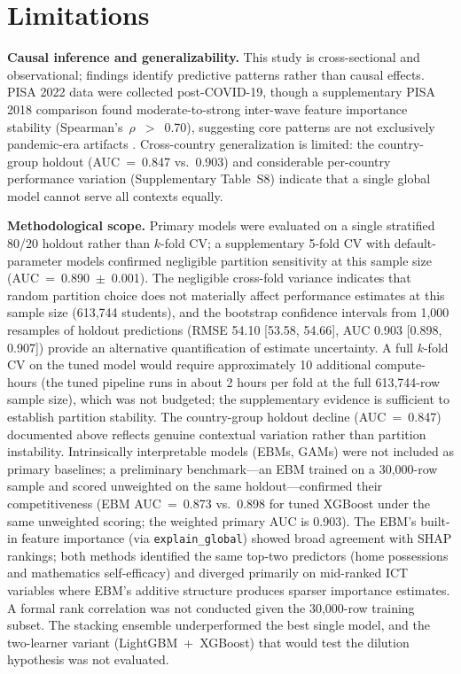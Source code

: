\documentclass[review,12pt]{elsarticle}
\begin{document}
\section{Limitations}
\label{sec:limitations}

\textbf{Causal inference and generalizability.}
This study is cross-sectional and observational; findings identify predictive patterns rather than causal effects. PISA 2022 data were collected post-COVID-19, though a supplementary PISA 2018 comparison found moderate-to-strong inter-wave feature importance stability (Spearman's~$\rho$~$>$~0.70), suggesting core patterns are not exclusively pandemic-era artifacts \citep{Lavelle_Hill_2024}. Cross-country generalization is limited: the country-group holdout (AUC~=~0.847 vs.\ 0.903) and considerable per-country performance variation (Supplementary Table~S8) indicate that a single global model cannot serve all contexts equally.

\textbf{Methodological scope.}
Primary models were evaluated on a single stratified 80/20 holdout rather than $k$-fold CV; a supplementary 5-fold CV with default-parameter models confirmed negligible partition sensitivity at this sample size (AUC~=~0.890~$\pm$~0.001). The negligible cross-fold variance indicates that random partition choice does not materially affect performance estimates at this sample size (613,744 students), and the bootstrap confidence intervals from 1,000 resamples of holdout predictions (RMSE 54.10 [53.58, 54.66], AUC 0.903 [0.898, 0.907]) provide an alternative quantification of estimate uncertainty. A full $k$-fold CV on the tuned model would require approximately 10 additional compute-hours (the tuned pipeline runs in about 2 hours per fold at the full 613,744-row sample size), which was not budgeted; the supplementary evidence is sufficient to establish partition stability. The country-group holdout decline (AUC~=~0.847) documented above reflects genuine contextual variation rather than partition instability. Intrinsically interpretable models (EBMs, GAMs) were not included as primary baselines; a preliminary benchmark---an EBM trained on a 30,000-row sample and scored unweighted on the same holdout---confirmed their competitiveness (EBM AUC~=~0.873 vs.\ 0.898 for tuned XGBoost under the same unweighted scoring; the weighted primary AUC is 0.903). The EBM's built-in feature importance (via \texttt{explain\_global}) showed broad agreement with SHAP rankings; both methods identified the same top-two predictors (home possessions and mathematics self-efficacy) and diverged primarily on mid-ranked ICT variables where EBM's additive structure produces sparser importance estimates. A formal rank correlation was not conducted given the 30,000-row training subset. The stacking ensemble underperformed the best single model, and the two-learner variant (LightGBM~+~XGBoost) that would test the dilution hypothesis was not evaluated.
\end{document}
